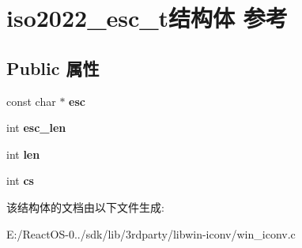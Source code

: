 \hypertarget{structiso2022__esc__t}{}\section{iso2022\+\_\+esc\+\_\+t结构体 参考}
\label{structiso2022__esc__t}
\subsection*{Public 属性}
\begin{DoxyCompactItemize}
\item 
\mbox{\label{structiso2022__esc__t_aff9b50aa49c33f7701d25d568583a85e}} 
const char $\ast$ {\bfseries esc}
\item 
\mbox{\label{structiso2022__esc__t_a36985d0712f52bc45aa210a3a9cc8744}} 
int {\bfseries esc\+\_\+len}
\item 
\mbox{\label{structiso2022__esc__t_a145975cd39ea77bcffd40e62ffddcc7b}} 
int {\bfseries len}
\item 
\mbox{\label{structiso2022__esc__t_ac8f98c164517f0abd994605ca7d27ed4}} 
int {\bfseries cs}
\end{DoxyCompactItemize}


该结构体的文档由以下文件生成\+:\begin{DoxyCompactItemize}
\item 
E\+:/\+React\+O\+S-\/0../sdk/lib/3rdparty/libwin-\/iconv/win\+\_\+iconv.\+c\end{DoxyCompactItemize}
